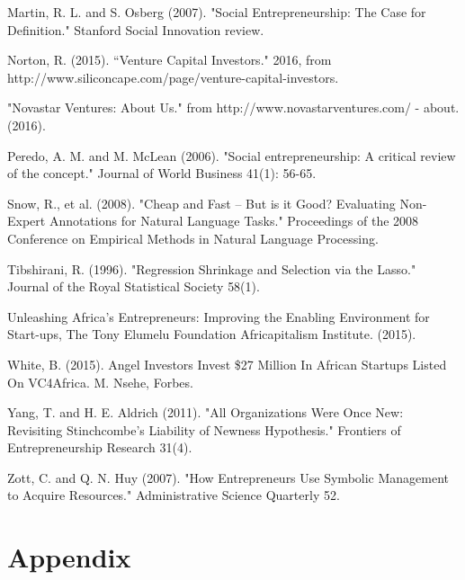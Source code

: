 \documentclass[12pt]{article}
\begin{document}
Martin, R. L. and S. Osberg (2007). "Social Entrepreneurship: The Case for Definition." Stanford Social Innovation review.
	
Norton, R. (2015). ``Venture Capital Investors." 2016, from http://www.siliconcape.com/page/venture-capital-investors.

"Novastar Ventures: About Us." from http://www.novastarventures.com/ - about. (2016). 
	
Peredo, A. M. and M. McLean (2006). "Social entrepreneurship: A critical review of the concept." Journal of World Business 41(1): 56-65.
	
Snow, R., et al. (2008). "Cheap and Fast -- But is it Good? Evaluating Non-Expert Annotations for Natural Language Tasks." Proceedings of the 2008 Conference on Empirical Methods in Natural Language Processing.
	
Tibshirani, R. (1996). "Regression Shrinkage and Selection via the Lasso." Journal of the Royal Statistical Society 58(1).

Unleashing Africa's Entrepreneurs: Improving the Enabling Environment for Start-ups, The Tony Elumelu Foundation Africapitalism Institute. (2015). 
	
White, B. (2015). Angel Investors Invest \$27 Million In African Startups Listed On VC4Africa. M. Nsehe, Forbes.
	
Yang, T. and H. E. Aldrich (2011). "All Organizations Were Once New: Revisiting Stinchcombe's Liability of Newness Hypothesis." Frontiers of Entrepreneurship Research 31(4).
	
Zott, C. and Q. N. Huy (2007). "How Entrepreneurs Use Symbolic Management to Acquire Resources." Administrative Science Quarterly 52.

\endgroup

\clearpage

\section{Appendix}

\setcounter{table}{0}
\renewcommand{\thetable}{A\arabic{table}}

\setcounter{figure}{0}
\renewcommand{\thefigure}{A\arabic{figure}}
\end{document}
